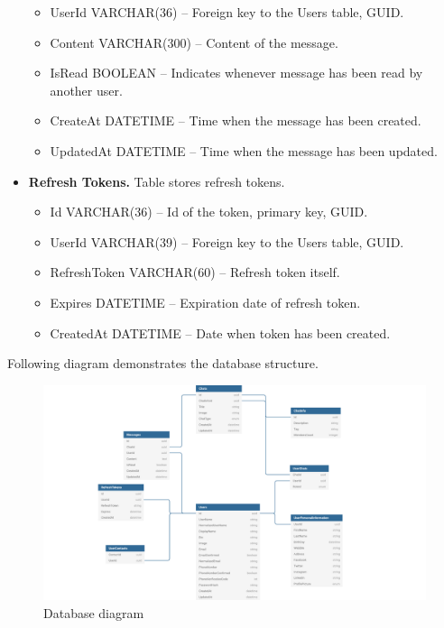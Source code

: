 \begin{itemize}
\begin{itemize}
        \item UserId VARCHAR(36) -- Foreign key to the Users table, GUID\@.
        \item Content VARCHAR(300) -- Content of the message.
        \item IsRead BOOLEAN -- Indicates whenever message has been read by another user.
        \item CreateAt DATETIME -- Time when the message has been created.
        \item UpdatedAt DATETIME -- Time when the message has been updated.
    \end{itemize}
    \item \textbf{Refresh Tokens.} Table stores refresh tokens.
    \begin{itemize}
        \item Id VARCHAR(36) -- Id of the token, primary key, GUID\@.
        \item UserId VARCHAR(39) -- Foreign key to the Users table, GUID\@.
        \item RefreshToken VARCHAR(60) -- Refresh token itself.
        \item Expires DATETIME -- Expiration date of refresh token.
        \item CreatedAt DATETIME -- Date when token has been created.
    \end{itemize}
\end{itemize}
Following diagram demonstrates the database structure.
\begin{figure}[H]
    \centering
    \includegraphics[width=1.2\textwidth]{Pictures/DB_diagram}
    \caption{Database diagram}\label{fig:figure5}
\end{figure}